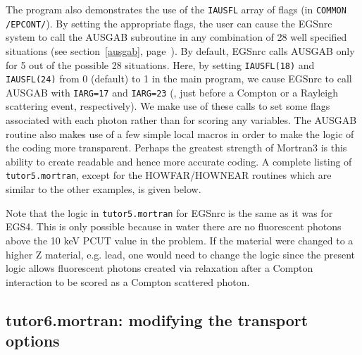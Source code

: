 The program also demonstrates the use of the {\tt IAUSFL} array of
flags (in {\tt COMMON /EPCONT/}).  By setting the appropriate flags,
the user can cause the EGSnrc system to call the AUSGAB subroutine in
any combination of 28 well specified situations (see section~\ref{ausgab},
page~\pageref{ausgab}).
By default, EGSnrc calls AUSGAB only for 5 out of the
possible 28 situations.  Here, by setting {\tt IAUSFL(18)} and
{\tt IAUSFL(24)} from 0 (default) to 1 in the main program, we cause EGSnrc
to call AUSGAB with {\tt IARG=17} and {\tt IARG=23} (\ie, just before a
Compton or a Rayleigh scattering event, respectively).  We make use of
these calls to set some flags associated with each photon rather than
for scoring any variables.  The AUSGAB routine also makes use of a few
simple local macros in order to make the logic of the coding more
transparent.  Perhaps the greatest strength of Mortran3 is this
ability to create readable and hence more accurate coding.
A complete listing of {\tt tutor5.mortran}, except for the HOWFAR/HOWNEAR
routines
which are similar to the other examples, is given below.
 

Note that the logic in {\tt tutor5.mortran} for EGSnrc 
is the same as it was for EGS4.  This is only possible because in water
there are no fluorescent photons above the 10 keV PCUT value in the
problem.  If the material were changed to a higher Z material, e.g. lead,
one would need to change the logic since the present logic allows
fluorescent photons created via relaxation after a Compton interaction to
be scored as a Compton scattered photon.
 
\begin{latexonly}
%


\clearpage
\end{latexonly}

\begin{htmlonly}
\clearpage

\clearpage

\clearpage
\end{htmlonly}


\subsection{tutor6.mortran: modifying the transport options}
\label{tutor6}

